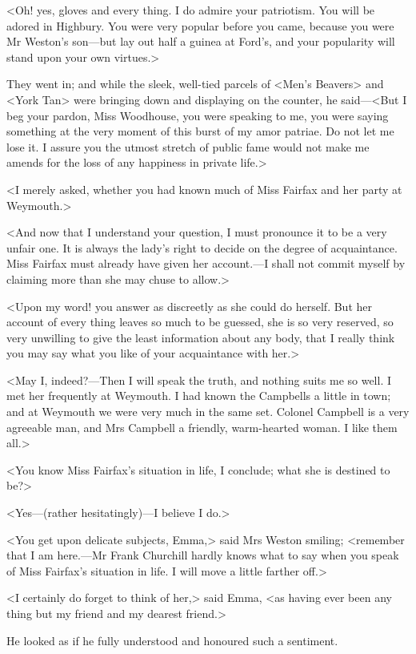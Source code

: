 <Oh! yes, gloves and every thing. I do admire your patriotism. You will be adored in Highbury. You were very popular before you came, because you were Mr Weston's son—but lay out half a guinea at Ford's, and your popularity will stand upon your own virtues.>

They went in; and while the sleek, well-tied parcels of <Men's Beavers> and <York Tan> were bringing down and displaying on the counter, he said—<But I beg your pardon, Miss Woodhouse, you were speaking to me, you were saying something at the very moment of this burst of my amor patriae. Do not let me lose it. I assure you the utmost stretch of public fame would not make me amends for the loss of any happiness in private life.>

<I merely asked, whether you had known much of Miss Fairfax and her party at Weymouth.>

<And now that I understand your question, I must pronounce it to be a very unfair one. It is always the lady's right to decide on the degree of acquaintance. Miss Fairfax must already have given her account.—I shall not commit myself by claiming more than she may chuse to allow.>

<Upon my word! you answer as discreetly as she could do herself. But her account of every thing leaves so much to be guessed, she is so very reserved, so very unwilling to give the least information about any body, that I really think you may say what you like of your acquaintance with her.>

<May I, indeed?—Then I will speak the truth, and nothing suits me so well. I met her frequently at Weymouth. I had known the Campbells a little in town; and at Weymouth we were very much in the same set. Colonel Campbell is a very agreeable man, and Mrs Campbell a friendly, warm-hearted woman. I like them all.>

<You know Miss Fairfax's situation in life, I conclude; what she is destined to be?>

<Yes—(rather hesitatingly)—I believe I do.>

<You get upon delicate subjects, Emma,> said Mrs Weston smiling; <remember that I am here.—Mr Frank Churchill hardly knows what to say when you speak of Miss Fairfax's situation in life. I will move a little farther off.>

<I certainly do forget to think of her,> said Emma, <as having ever been any thing but my friend and my dearest friend.>

He looked as if he fully understood and honoured such a sentiment.

